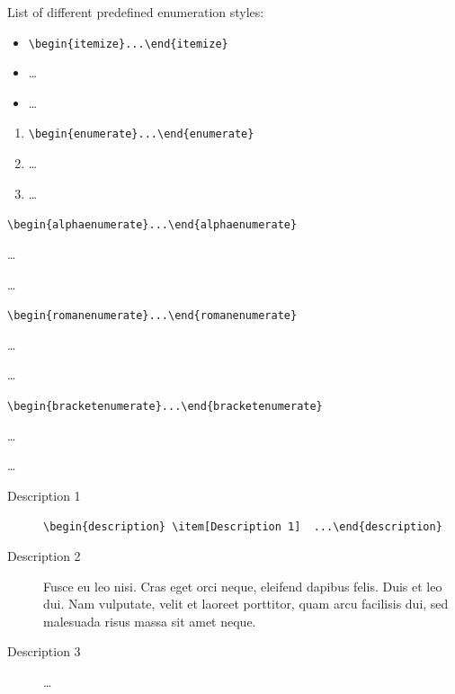 \documentclass[a4paper,UKenglish,cleveref, autoref]{lipics-v2019}
\begin{document}
List of different predefined enumeration styles:

\begin{itemize}
\item \verb|\begin{itemize}...\end{itemize}|
\item \dots
\item \dots
\end{itemize}

\begin{enumerate}
\item \verb|\begin{enumerate}...\end{enumerate}|
\item \dots
\item \dots
\end{enumerate}

\begin{alphaenumerate}
\item \verb|\begin{alphaenumerate}...\end{alphaenumerate}|
\item \dots
\item \dots
\end{alphaenumerate}

\begin{romanenumerate}
\item \verb|\begin{romanenumerate}...\end{romanenumerate}|
\item \dots
\item \dots
\end{romanenumerate}

\begin{bracketenumerate}
\item \verb|\begin{bracketenumerate}...\end{bracketenumerate}|
\item \dots
\item \dots
\end{bracketenumerate}

\begin{description}
\item[Description 1] \verb|\begin{description} \item[Description 1]  ...\end{description}|
\item[Description 2] Fusce eu leo nisi. Cras eget orci neque, eleifend dapibus felis. Duis et leo dui. Nam vulputate, velit et laoreet porttitor, quam arcu facilisis dui, sed malesuada risus massa sit amet neque.
\item[Description 3]  \dots
\end{description}
\end{document}
